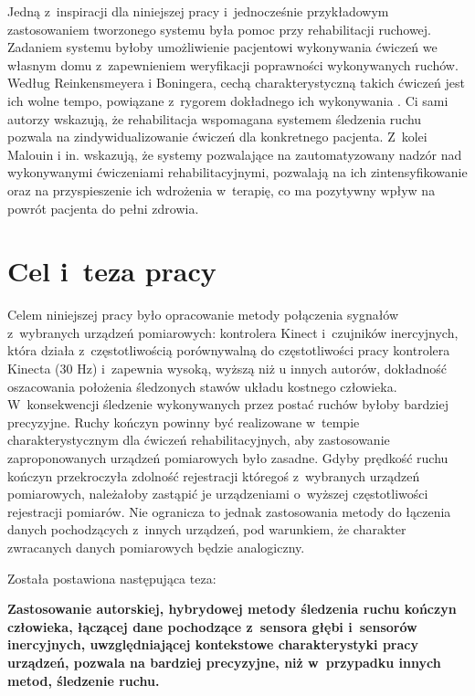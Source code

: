 Jedną z~inspiracji dla niniejszej pracy i~jednocześnie przykładowym zastosowaniem tworzonego systemu była pomoc przy rehabilitacji ruchowej. Zadaniem systemu byłoby umożliwienie pacjentowi wykonywania ćwiczeń we własnym domu z~zapewnieniem weryfikacji poprawności wykonywanych ruchów. Według Reinkensmeyera i Boningera, cechą charakterystyczną takich ćwiczeń jest ich wolne tempo, powiązane z~rygorem dokładnego ich wykonywania  \cite{Reinkensmeyer2012}. Ci sami autorzy wskazują, że rehabilitacja wspomagana systemem śledzenia ruchu pozwala na zindywidualizowanie ćwiczeń dla konkretnego pacjenta. Z~kolei Malouin i in. \cite{Malouin2003} wskazują, że systemy pozwalające na zautomatyzowany nadzór nad wykonywanymi ćwiczeniami rehabilitacyjnymi, pozwalają na ich zintensyfikowanie oraz na przyspieszenie ich wdrożenia w~terapię, co ma pozytywny wpływ na powrót pacjenta do pełni zdrowia.

\section{Cel i~teza pracy}
Celem niniejszej pracy było opracowanie metody połączenia sygnałów z~wybranych urządzeń pomiarowych: kontrolera Kinect i~czujników inercyjnych, która działa z~częstotliwością porównywalną do częstotliwości pracy kontrolera Kinecta (30 Hz) i~zapewnia wysoką, wyższą niż u innych autorów, dokładność oszacowania położenia śledzonych stawów układu kostnego człowieka. W~konsekwencji śledzenie wykonywanych przez postać ruchów byłoby bardziej precyzyjne. Ruchy kończyn powinny być realizowane w~tempie charakterystycznym dla ćwiczeń rehabilitacyjnych, aby zastosowanie zaproponowanych urządzeń pomiarowych było zasadne. Gdyby prędkość ruchu kończyn przekroczyła zdolność rejestracji któregoś z~wybranych urządzeń pomiarowych, należałoby zastąpić je urządzeniami o~wyższej częstotliwości rejestracji pomiarów. Nie ogranicza to jednak zastosowania metody do łączenia danych pochodzących z~innych urządzeń, pod warunkiem, że charakter zwracanych danych pomiarowych będzie analogiczny. 

Została postawiona następująca teza:\\
\begin{center}
	\textbf{Zastosowanie autorskiej, hybrydowej metody śledzenia ruchu kończyn człowieka, łączącej dane pochodzące z~sensora głębi i~sensorów inercyjnych, uwzględniającej kontekstowe charakterystyki pracy urządzeń, pozwala na bardziej precyzyjne, niż w~przypadku innych metod, śledzenie ruchu.}
\end{center}


